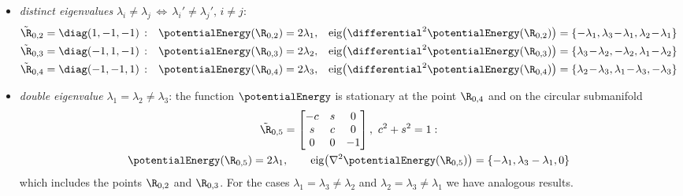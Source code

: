 \begin{Example}
\begin{itemize}
\item \textit{distinct eigenvalues} $\lambda_i \neq \lambda_j \, \Leftrightarrow \, \lambda_i' \neq \lambda_j', \, i\neq j$: 
\begin{align*}
 \tilde{\R}_{0,2} &= \diag(1,-1,-1)\, :&
 \potentialEnergy(\R_{0,2}) &= 2 \lambda_1,&
 \text{eig}\big( \differential^2\potentialEnergy(\R_{0,2}) \big) &= \{ -\lambda_1, \lambda_3 \!-\! \lambda_1, \lambda_2 \!-\! \lambda_1 \}
\\
 \tilde{\R}_{0,3} &= \diag(-1,1,-1)\, :&
 \potentialEnergy(\R_{0,3}) &= 2 \lambda_2,&
 \text{eig}\big( \differential^2\potentialEnergy(\R_{0,3}) \big) &= \{ \lambda_3\!-\!\lambda_2, -\lambda_2, \lambda_1 \!-\! \lambda_2 \}
\\
 \tilde{\R}_{0,4} &= \diag(-1,-1,1)\, :&
 \potentialEnergy(\R_{0,4}) &= 2 \lambda_3,&
 \text{eig}\big( \differential^2\potentialEnergy(\R_{0,4}) \big) &= \{ \lambda_2\!-\!\lambda_3, \lambda_1 \!-\! \lambda_3, -\lambda_3 \}
\end{align*}

\item \textit{double eigenvalue} $\lambda_1 = \lambda_2 \neq \lambda_3$: the function $\potentialEnergy$ is stationary at the point $\R_{0,4}$ and on the circular submanifold
\begin{multline*}
 \tilde{\R}_{0,5} = \begin{bmatrix} -c & s & 0 \\ s & c & 0 \\ 0 & 0 & -1 \end{bmatrix}, \ c^2 + s^2 = 1:
\\
 \potentialEnergy(\R_{0,5}) = 2 \lambda_1,
\qquad
 \text{eig}\big( \nabla^2\potentialEnergy(\R_{0,5}) \big) = \{ -\lambda_1, \lambda_3-\lambda_1, 0 \}
\end{multline*}
which includes the points $\R_{0,2}$ and $\R_{0,3}$.
For the cases $\lambda_1 = \lambda_3 \neq \lambda_2$ and $\lambda_2 = \lambda_3 \neq \lambda_1$ we have analogous results.


\end{itemize}
\end{Example}
